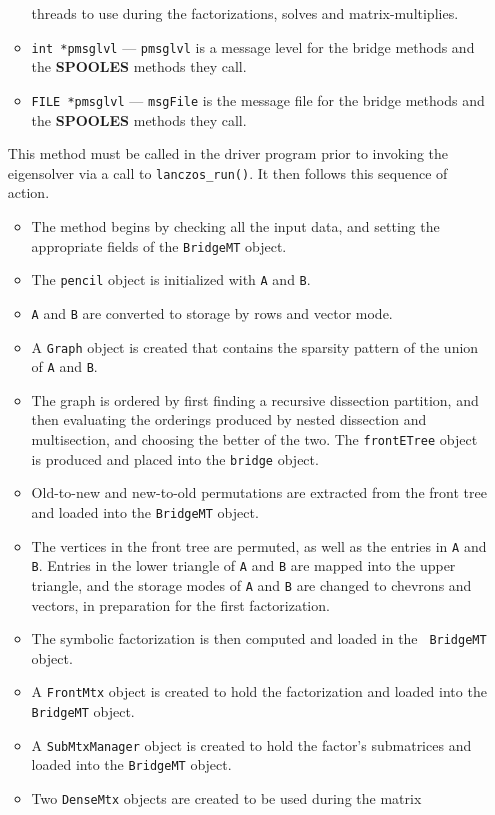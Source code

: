 \begin{enumerate}
\begin{itemize}
threads to use during the factorizations, solves and
matrix-multiplies.
\item {\tt int *pmsglvl} --- {\tt *pmsglvl} is a message level for
the bridge methods and the {\bf SPOOLES} methods they call.
\item {\tt FILE *pmsglvl} --- {\tt msgFile} is the message file
for the bridge methods and the {\bf SPOOLES} methods they call.
\end{itemize}
This method must be called in the driver program prior to invoking
the eigensolver via a call to {\tt lanczos\_run()}.
It then follows this sequence of action.
\begin{itemize}
\item
The method begins by checking all the input data,
and setting the appropriate fields of the {\tt BridgeMT} object.
\item
The {\tt pencil} object is initialized with {\tt A} and {\tt B}.
\item
{\tt A} and {\tt B} are converted to storage by rows and vector mode.
\item
A {\tt Graph} object is created that contains the sparsity pattern of
the union of {\tt A} and {\tt B}.
\item
The graph is ordered by first finding a recursive dissection partition,
and then evaluating the orderings produced by nested dissection and
multisection, and choosing the better of the two.
The {\tt frontETree} object is produced and placed into the {\tt bridge}
object.
\item
Old-to-new and new-to-old permutations are extracted from the front tree
and loaded into the {\tt BridgeMT} object.
\item
The vertices in the front tree are permuted, as well as the entries in 
{\tt A} and {\tt B}.
Entries in the lower triangle of {\tt A} and {\tt B} are mapped into the
upper triangle, and the storage modes of {\tt A} and {\tt B} are changed
to chevrons and vectors, in preparation for the first factorization.
\item
The symbolic factorization is then computed and loaded in the {\tt
BridgeMT} object.
\item
A {\tt FrontMtx} object is created to hold the factorization
and loaded into the {\tt BridgeMT} object.
\item
A {\tt SubMtxManager} object is created to hold the factor's
submatrices and loaded into the {\tt BridgeMT} object.
\item
Two {\tt DenseMtx} objects are created to be used during the matrix

\end{itemize}
\end{enumerate}
